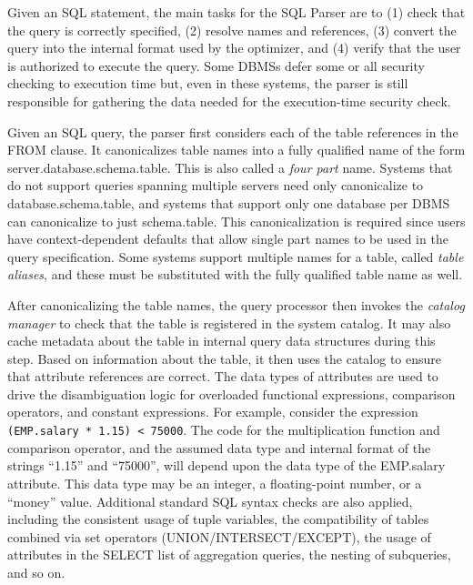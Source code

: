 \documentclass[a4paper,11pt,twoside,openright]{book}
\begin{document}
Given an SQL statement, the main tasks for the SQL Parser are to
  (1) check that the query is correctly specified, (2) resolve names and
  references, (3) convert the query into the internal format used by the
  optimizer, and (4) verify that the user is authorized to execute the
  query. Some DBMSs defer some or all security checking to execution
  time but, even in these systems, the parser is still responsible for
  gathering the data needed for the execution-time security check.

Given an SQL query, the parser first considers each of the table
references in the FROM clause. It canonicalizes table names into a fully
qualified name of the form server.database.schema.table. This is also
called a \emph{four part} name. Systems that do not support queries
spanning multiple servers need only canonicalize to
database.schema.table, and systems that support only one database per
DBMS can canonicalize to just schema.table. This canonicalization is
required since users have context-dependent defaults that allow single
part names to be used in the query specification. Some systems support
multiple names for a table, called \emph{table aliases}, and these must
be substituted with the fully qualified table name as well.

After canonicalizing the table names, the query processor then invokes
the \emph{catalog manager} to check that the table is registered in the
system catalog. It may also cache metadata about the table in internal
query data structures during this step. Based on information about the
table, it then uses the catalog to ensure that attribute references are
correct. The data types of attributes are used to drive the
disambiguation logic for overloaded functional expressions, comparison
operators, and constant expressions. For example, consider the
expression \texttt{(EMP.salary * 1.15) < 75000}. The code for the
multiplication function and comparison operator, and the assumed data
type and internal format of the strings ``1.15'' and ``75000'', will
depend upon the data type of the EMP.salary attribute. This data type
may be an integer, a floating-point number, or a ``money'' value.
Additional standard SQL syntax checks are also applied, including the
consistent usage of tuple variables, the compatibility of tables
combined via set operators (UNION/INTERSECT/EXCEPT), the usage of
attributes in the SELECT list of aggregation queries, the nesting of
subqueries, and so on.
\end{document}
